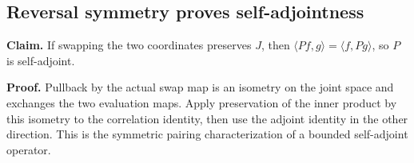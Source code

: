 \documentclass[11pt,a4paper]{report}
\begin{document}
\subsection{\texorpdfstring{Reversal symmetry proves self-adjointness}{Reversal symmetry proves self-adjointness}}
\label{report-step-WassersteinMixing-Semigroup-lean-2}


\textbf{Claim.} If swapping the two coordinates preserves \(J\), then \(\langle Pf,g\rangle=\langle f,Pg\rangle\), so \(P\) is self-adjoint.



\textbf{Proof.} Pullback by the actual swap map is an isometry on the joint space and exchanges the two evaluation maps. Apply preservation of the inner product by this isometry to the correlation identity, then use the adjoint identity in the other direction. This is the symmetric pairing characterization of a bounded self-adjoint operator.
\end{document}
